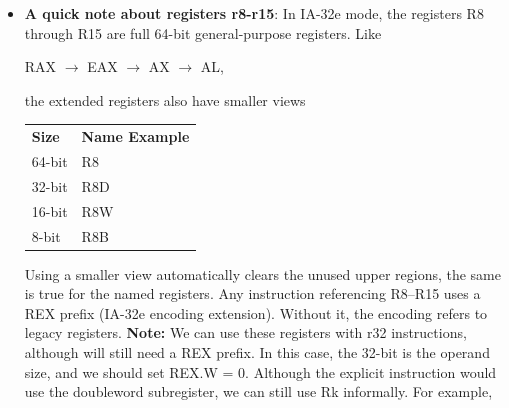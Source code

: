 \documentclass{report}
\begin{document}
\begin{itemize}
\begin{enumerate}
\begin{cppcode}
                    // Jump on ZF zero
                    jz
                    \end{cppcode}
                \item \textbf{Testing specific bits}:
                    \bigbreak \noindent 
                    \begin{cppcode}
                    test rax, 1
                    \end{cppcode}
                    \bigbreak \noindent 
                    This tests if the LSB is set (check ZF).
            \end{enumerate}
        \item \textbf{A quick note about registers r8-r15}: In IA-32e mode, the registers R8 through R15 are full 64-bit general-purpose registers. Like 
            \begin{center}
                RAX $\to $ EAX $\to $ AX $\to $ AL, 
            \end{center}
            the extended registers also have smaller views
            \begin{center}
                \begin{tabularx}{\textwidth}{@{}XX@{}}
                    \toprule
                    \textbf{Size}	&\textbf{Name Example} \\
                    64-bit&	R8\\[2ex]
                    32-bit&	R8D\\[2ex]
                    16-bit&	R8W\\[2ex]
                    8-bit	&R8B \\
                    \midrule
                    \bottomrule
                \end{tabularx}
            \end{center}
            Using a smaller view automatically clears the unused upper regions, the same is true for the named registers.
            \bigbreak \noindent 
            Any instruction referencing R8–R15 uses a REX prefix (IA-32e encoding extension). Without it, the encoding refers to legacy registers.
            \bigbreak \noindent 
            \textbf{Note:} We can use these registers with r32 instructions, although will still need a REX prefix. In this case, the 32-bit is the operand size, and we should set REX.W = 0. Although the explicit instruction would use the doubleword subregister, we can still use Rk informally. For example,
            \bigbreak \noindent 
            \begin{cppcode}

\end{cppcode}
\end{itemize}
\end{document}
